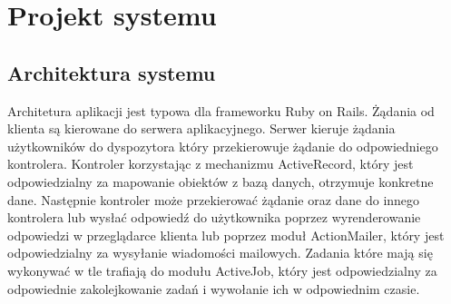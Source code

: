 \chapter{Projekt systemu}
\label{cha:analizaAplikacji}

\section{Architektura systemu}
\label{sec:architektura}
Architetura aplikacji jest typowa dla frameworku Ruby on Rails. Żądania od klienta są kierowane do serwera aplikacyjnego. Serwer kieruje żądania użytkowników do dyspozytora który przekierowuje żądanie do odpowiedniego kontrolera. Kontroler korzystając z mechanizmu ActiveRecord, który jest odpowiedzialny za mapowanie obiektów z bazą danych, otrzymuje konkretne dane. Następnie kontroler może przekierować żądanie oraz dane do innego kontrolera lub wysłać odpowiedź do użytkownika poprzez wyrenderowanie odpowiedzi w przeglądarce klienta lub poprzez moduł ActionMailer, który jest odpowiedzialny za wysyłanie wiadomości mailowych. Zadania które mają się wykonywać w tle trafiają do modułu ActiveJob, który jest odpowiedzialny za odpowiednie zakolejkowanie zadań i wywołanie ich w odpowiednim czasie.\cite{rails_guide}
\noindent
\begin{minipage}{\linewidth}
\label{use-case}
\end{minipage}

